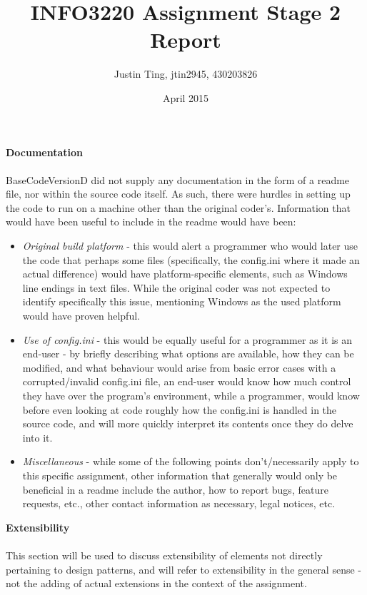 \documentclass[11pt]{article}
\title{INFO3220 Assignment Stage 2 Report}
\author{Justin Ting, jtin2945, 430203826}
\date{April 2015}
\begin{document}
\maketitle

{\large\textbf{Documentation}}\\\\
BaseCodeVersionD did not supply any documentation in the form of a readme file, nor within the source code itself. As such, there were hurdles in setting up the code to run on a machine other than the original coder's. Information that would have been useful to include in the readme would have been:
\begin{itemize}
\item \textit{Original build platform} - this would alert a programmer who would later use the code that perhaps some files (specifically, the config.ini where it made an actual difference) would have platform-specific elements, such as Windows line endings in text files. While the original coder was not expected to identify specifically this issue, mentioning Windows as the used platform would have proven helpful.
\item \textit{Use of config.ini} - this would be equally useful for a programmer as it is an end-user - by briefly describing what options are available, how they can be modified, and what behaviour would arise from basic error cases with a corrupted/invalid config.ini file, an end-user would know how much control they have over the program's environment, while a programmer, would know before even looking at code roughly how the config.ini is handled in the source code, and will more quickly interpret its contents once they do delve into it.
\item \textit{Miscellaneous} - while some of the following points don't/necessarily apply to this specific assignment, other information that generally would only be beneficial in a readme include the author, how to report bugs, feature requests, etc., other contact information as necessary, legal notices, etc.\\
\end{itemize}

{\large\textbf{Extensibility}}\\\\
This section will be used to discuss extensibility of elements not directly pertaining to design patterns, and will refer to extensibility in the general sense - not the adding of actual extensions in the context of the assignment.\\
\end{document}
